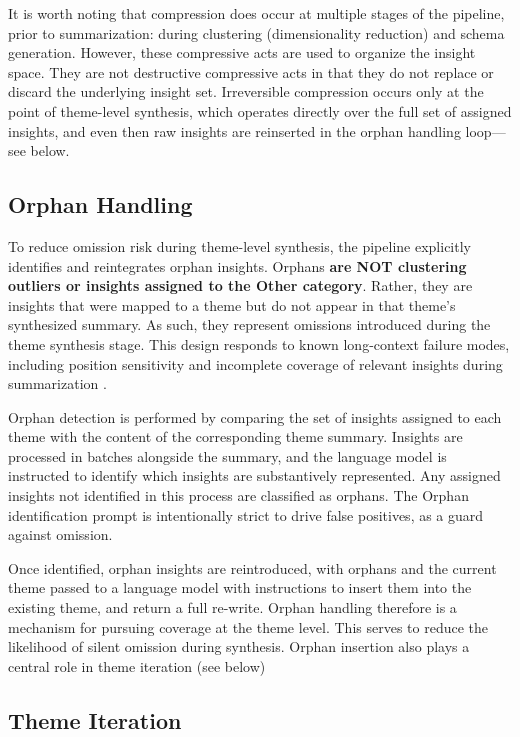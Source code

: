 \documentclass[
  11pt,
]{article}
\begin{document}
It is worth noting that compression does occur at multiple stages of the
pipeline, prior to summarization: during clustering (dimensionality
reduction) and schema generation. However, these compressive acts are
used to organize the insight space. They are not destructive compressive
acts in that they do not replace or discard the underlying insight set.
Irreversible compression occurs only at the point of theme-level
synthesis, which operates directly over the full set of assigned
insights, and even then raw insights are reinserted in the orphan
handling loop---see below.

\subsection{Orphan Handling}\label{orphan-handling}

To reduce omission risk during theme-level synthesis, the pipeline
explicitly identifies and reintegrates orphan insights. Orphans
\textbf{are NOT clustering outliers or insights assigned to the Other
category}. Rather, they are insights that were mapped to a theme but do
not appear in that theme's synthesized summary. As such, they represent
omissions introduced during the theme synthesis stage. This design
responds to known long-context failure modes, including position
sensitivity and incomplete coverage of relevant insights during
summarization \cite{liu2024,laban2024}.

Orphan detection is performed by comparing the set of insights assigned
to each theme with the content of the corresponding theme summary.
Insights are processed in batches alongside the summary, and the
language model is instructed to identify which insights are
substantively represented. Any assigned insights not identified in this
process are classified as orphans. The Orphan identification prompt is
intentionally strict to drive false positives, as a guard against
omission.

Once identified, orphan insights are reintroduced, with orphans and the
current theme passed to a language model with instructions to insert
them into the existing theme, and return a full re-write. Orphan
handling therefore is a mechanism for pursuing coverage at the theme
level. This serves to reduce the likelihood of silent omission during
synthesis. Orphan insertion also plays a central role in theme iteration
(see below)

\subsection{Theme Iteration}\label{theme-iteration}
\end{document}
